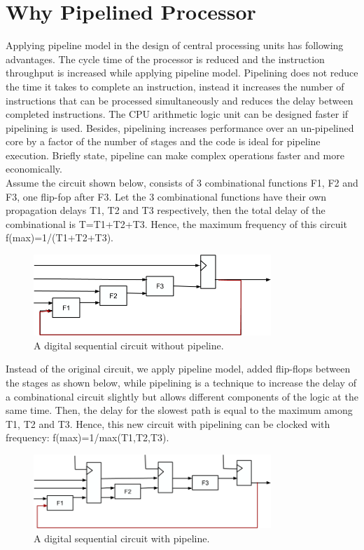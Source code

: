 \documentclass[12pt,a4paper]{report}
\begin{document}
\section{Why Pipelined Processor}
Applying pipeline model in the design of central processing units has following advantages. The cycle time of the processor is reduced and the instruction throughput is increased while applying pipeline model. Pipelining does not reduce the time it takes to complete an instruction, instead it increases the number of instructions that can be processed simultaneously and reduces the delay between completed instructions. The CPU arithmetic logic unit can be designed faster if pipelining is used. Besides, pipelining increases performance over an un-pipelined core by a factor of the number of stages and the code is ideal for pipeline execution. Briefly state, pipeline can make complex operations faster and more economically.\\
Assume the circuit shown below, consists of 3 combinational functions F1, F2 and F3, one flip-fop after F3. Let the 3 combinational functions have their own propagation delays T1, T2 and T3 respectively, then the total delay of the combinational is T=T1+T2+T3. Hence, the maximum frequency of this circuit f(max)=1/(T1+T2+T3).\\
\begin{figure}[h]
  \centering
  \includegraphics[width=0.8\textwidth]{I1}
  \caption{A digital sequential circuit without pipeline.}
  \label{fig:i1}
\end{figure}
\noindent Instead of the original circuit, we apply pipeline model, added flip-flops between the stages as shown below, while pipelining is a technique to increase the delay of a combinational circuit slightly but allows different components of the logic at the same time. Then, the delay for the slowest path is equal to the maximum among T1, T2 and T3. Hence, this new circuit with pipelining can be clocked with frequency: f(max)=1/max(T1,T2,T3).\\
\begin{figure}[h]
  \centering
  \includegraphics[width=0.8\textwidth]{I2}
  \caption{A digital sequential circuit with pipeline.}
  \label{fig:i2}
\end{figure}
\end{document}
